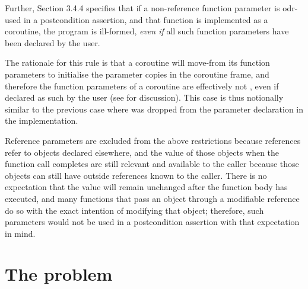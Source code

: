 Further, \cite{P2900R10} Section 3.4.4 specifies that if a non-reference function parameter is odr-used in a postcondition assertion, and that function is implemented as a coroutine, the program is ill-formed, \emph{even if} all such function parameters have been declared  by the user.

The rationale for this rule is that a coroutine will move-from its function parameters to initialise the parameter copies in the coroutine frame, and therefore the function parameters of a coroutine are effectively not , even if declared as such by the user (see \cite{P3387R0} for discussion). This case is thus notionally similar to the previous case where  was dropped from the parameter declaration in the implementation.

Reference parameters are excluded from the above restrictions because references refer to objects declared elsewhere, and the value of those objects when the function call completes are still relevant and available to the caller because those objects can still have outside references known to the caller.  
There is no expectation that the value will remain unchanged after the function body has executed, and many functions that pass an object through a modifiable reference do so with the exact intention of modifying that object; therefore, such parameters would not be used in a postcondition assertion with that expectation in mind.

\section{The problem}

